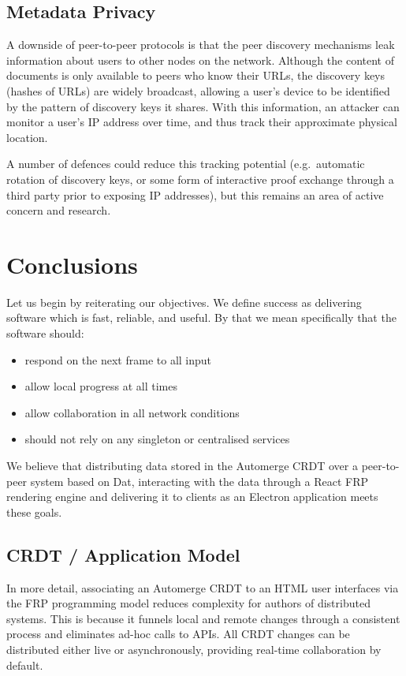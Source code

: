 \documentclass[sigplan,10pt]{acmart}
\begin{document}
\subsection{Metadata Privacy}

A downside of peer-to-peer protocols is that the peer discovery mechanisms leak information about users to other nodes on the network.
Although the content of documents is only available to peers who know their URLs, the discovery keys (hashes of URLs) are widely broadcast, allowing a user's device to be identified by the pattern of discovery keys it shares.
With this information, an attacker can monitor a user's IP address over time, and thus track their approximate physical location.

A number of defences could reduce this tracking potential (e.g.\ automatic rotation of discovery keys, or some form of interactive proof exchange through a third party prior to exposing IP addresses), but this remains an area of active concern and research.

\section{Conclusions}

Let us begin by reiterating our objectives. We define success as delivering software which is fast, reliable, and useful. By that we mean specifically that the software should:
\begin{itemize}
    \item respond on the next frame to all input
    \item allow local progress at all times
    \item allow collaboration in all network conditions
    \item should not rely on any singleton or centralised services
\end{itemize}

We believe that distributing data stored in the Automerge CRDT over a peer-to-peer system based on Dat, interacting with the data through a React FRP rendering engine and delivering it to clients as an Electron application meets these goals.

\subsection{CRDT / Application Model}

In more detail, associating an Automerge CRDT to an HTML user interfaces via  the FRP programming model reduces complexity for authors of distributed systems. This is because it funnels local and remote changes through a consistent process and eliminates ad-hoc calls to APIs. All CRDT changes can be distributed either live or asynchronously, providing real-time collaboration by default.
\end{document}
